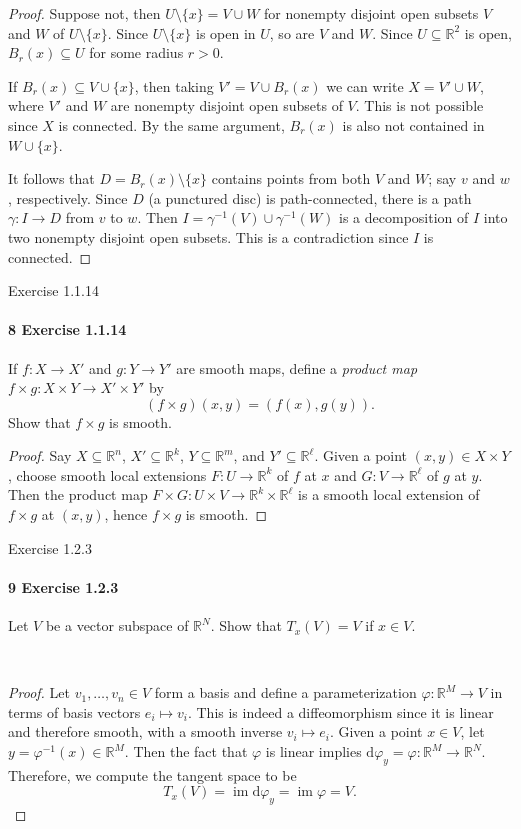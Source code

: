 \documentclass[12pt]{article}
\newlength{\myparskip}
\newenvironment{fullbox}{\begin{lrbox}{\savefullbox}\begin{minipage}{\dimexpr\textwidth-2\fboxsep\relax}\setlength{\parskip}{\myparskip}}{\end{minipage}\end{lrbox}\framebox[\textwidth]{\usebox{\savefullbox}}}
\newenvironment{pbox}[1][]{\begin{fullbox}\ifx#1\empty\else\paragraph{#1}\phantom{}\fi}{\end{fullbox}}
\theoremstyle{definition}
\newcommand{\R}{\mathbb{R}}
\renewcommand{\phi}{\varphi}
\newcommand{\<}{\langle}
\renewcommand{\>}{\rangle}
\newcommand{\seq}{\subseteq}
\DeclareMathOperator{\im}{im}
\newcommand{\dd}{\mathrm{d}}
\begin{document}
\begin{proof}
    Suppose not, then $U \setminus \{x\} = V \cup W$ for nonempty disjoint open subsets $V$ and $W$ of $U \setminus \{x\}$.
    Since $U \setminus \{x\}$ is open in $U$, so are $V$ and $W$.
    Since $U \seq \R^2$ is open, $B_r(x) \seq U$ for some radius $r > 0$.

    If $B_r(x) \seq V \cup\{x\}$, then taking $V' = V \cup B_r(x)$ we can write $X = V' \cup W$, where $V'$ and $W$ are nonempty disjoint open subsets of $V$.
    This is not possible since $X$ is connected.
    By the same argument, $B_r(x)$ is also not contained in $W \cup \{x\}$.

    It follows that $D = B_r(x) \setminus \{x\}$ contains points from both $V$ and $W$; say $v$ and $w$, respectively.
    Since $D$ (a punctured disc) is path-connected, there is a path $\gamma : I \to D$ from $v$ to $w$.
    Then $I = \gamma^{-1}(V) \cup \gamma^{-1}(W)$ is a decomposition of $I$ into two nonempty disjoint open subsets.
    This is a contradiction since $I$ is connected.
\end{proof}

\newpage
\begin{pbox}[8 Exercise 1.1.14]
    If $f : X \to X'$ and $g : Y \to Y'$ are smooth maps, define a \textit{product map} $f \times g : X \times Y \to X' \times Y'$ by
    \[
        (f \times g)(x, y) = (f(x), g(y)).
    \]
    Show that $f \times g$ is smooth.
\end{pbox}

\begin{proof}
    Say $X \seq \R^n$, $X' \seq \R^k$, $Y \seq \R^m$, and $Y' \seq \R^\ell$.
    Given a point $(x, y) \in X \times Y$, choose smooth local extensions $F : U \to \R^k$ of $f$ at $x$ and $G : V \to \R^\ell$ of $g$ at $y$.
    Then the product map $F \times G : U \times V \to \R^k \times \R^\ell$ is a smooth local extension of $f \times g$ at $(x, y)$, hence $f \times g$ is smooth.
\end{proof}

\begin{pbox}[9 Exercise 1.2.3]
    Let $V$ be a vector subspace of $\R^N$.
    Show that $T_x(V) = V$ if $x \in V$.
\end{pbox}\

\begin{proof}
    Let $v_1, \dots, v_n \in V$ form a basis and define a parameterization $\phi : \R^M \to V$ in terms of basis vectors $e_i \mapsto v_i$.
    This is indeed a diffeomorphism since it is linear and therefore smooth, with a smooth inverse $v_i \mapsto e_i$.
    Given a point $x \in V$, let $y = \phi^{-1}(x) \in \R^M$.
    Then the fact that $\phi$ is linear implies $\dd{\phi}_y = \phi : \R^M \to \R^N$.
    Therefore, we compute the tangent space to be
    \[
        T_x(V) = \im\dd{\phi}_y = \im \phi = V.
    \]
\end{proof}
\end{document}
